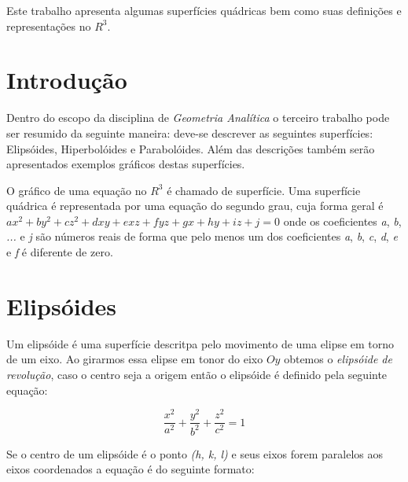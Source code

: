 \documentclass[
	article,			%
	11pt,				%
	oneside,			%
	a4paper,			%
	english,			%
	brazil,				%
	]{abntex2}
\begin{document}
\frenchspacing 

\maketitle

\begin{resumoumacoluna}
    
	Este trabalho apresenta algumas superfícies quádricas bem como suas
	definições e representações no $R^3$.

 \vspace{\onelineskip}
 
 \noindent
\end{resumoumacoluna}

\textual

    \section*{Introdução}

		Dentro do escopo da disciplina de \emph{Geometria Analítica} o terceiro
		trabalho pode ser resumido da seguinte maneira: deve-se descrever as
		seguintes superfícies:  Elipsóides, Hiperbolóides e Parabolóides. Além
		das descrições também serão apresentados exemplos gráficos destas
		superfícies.

		O gráfico de uma equação no $R^3$ é chamado de superfície. Uma
		superfície quádrica é representada por uma equação do segundo grau, cuja
		forma geral é $ ax^2 + by^2 + cz^2 + dxy + exz + fyz + gx + hy + iz + j
		= 0$ onde os coeficientes \emph{a}, \emph{b}, \emph{...} e \emph{j} são
		números reais de forma que pelo menos um dos coeficientes \emph{a},
		\emph{b}, \emph{c}, \emph{d}, \emph{e} e \emph{f} é diferente de zero.

    \section{Elipsóides}

		Um elipsóide é uma superfície descritpa pelo movimento de uma elipse em
		torno de um eixo. Ao girarmos essa elipse em tonor do eixo $Oy$ obtemos
		o \emph{elipsóide de revolução}, caso o centro seja a origem então o
		elipsóide é definido pela seguinte equação:

			$$\frac{x^2}{a^2}+\frac{y^2}{b^2}+\frac{z^2}{c^2}=1$$

		Se o centro de um elipsóide é o ponto \emph{(h, k, l)} e seus eixos
		forem paralelos aos eixos coordenados a equação é do seguinte
		formato:
\end{document}
